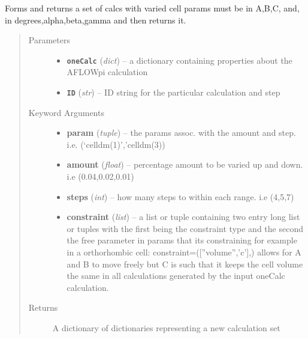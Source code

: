 \documentclass[letterpaper,10pt,english]{sphinxmanual}
\begin{document}
\begin{fulllineitems}
\label{prep:prep.varyCellParams}
Forms and returns a set of calcs with varied cell params must be in A,B,C,
and, in degrees,alpha,beta,gamma and then returns it.
\begin{quote}\begin{description}
\item[{Parameters}] \leavevmode\begin{itemize}
\item {} 
\textbf{\texttt{oneCalc}} (\emph{dict}) -- a dictionary containing properties about the AFLOWpi calculation

\item {} 
\textbf{\texttt{ID}} (\emph{str}) -- ID string for the particular calculation and step

\end{itemize}

\item[{Keyword Arguments}] \leavevmode\begin{itemize}
\item {} 
\textbf{param} (\emph{tuple}) --
the params assoc. with the amount and step. i.e. (`celldm(1)','celldm(3))

\item {} 
\textbf{amount} (\emph{float}) --
percentage amount to be varied up and down. i.e (0.04,0.02,0.01)

\item {} 
\textbf{steps} (\emph{int}) --
how many steps to within each range. i.e (4,5,7)

\item {} 
\textbf{constraint} (\emph{list}) --
a list or tuple containing two entry long list or tuples with
the first being the constraint type and the second the free
parameter in params that its constraining for example in a
orthorhombic cell: constraint=({[}''volume'','c'{]},) allows for A and B
to move freely but C is such that it keeps the cell volume the same
in all calculations generated by the input oneCalc calculation.

\end{itemize}

\item[{Returns}] \leavevmode
A dictionary of dictionaries representing a new calculation set

\end{description}\end{quote}

\end{fulllineitems}
\end{document}
